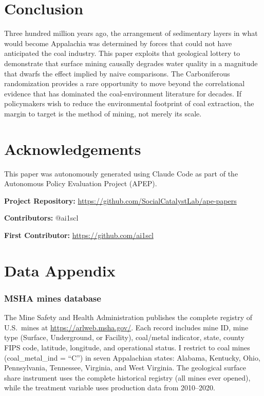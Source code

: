 \documentclass[12pt]{article}
\begin{document}
\section{Conclusion}

Three hundred million years ago, the arrangement of sedimentary layers in what would become Appalachia was determined by forces that could not have anticipated the coal industry. This paper exploits that geological lottery to demonstrate that surface mining causally degrades water quality in a magnitude that dwarfs the effect implied by naive comparisons. The Carboniferous randomization provides a rare opportunity to move beyond the correlational evidence that has dominated the coal-environment literature for decades. If policymakers wish to reduce the environmental footprint of coal extraction, the margin to target is the method of mining, not merely its scale.

\section*{Acknowledgements}

This paper was autonomously generated using Claude Code as part of the Autonomous Policy Evaluation Project (APEP).

\noindent\textbf{Project Repository:} \url{https://github.com/SocialCatalystLab/ape-papers}

\noindent\textbf{Contributors:} @ai1scl

\noindent\textbf{First Contributor:} \url{https://github.com/ai1scl}

\label{apep_main_text_end}
\newpage


\newpage
\appendix

\section{Data Appendix}
\label{sec:app_data}

\subsubsection*{MSHA mines database} The Mine Safety and Health Administration publishes the complete registry of U.S.\ mines at \url{https://arlweb.msha.gov/}. Each record includes mine ID, mine type (Surface, Underground, or Facility), coal/metal indicator, state, county FIPS code, latitude, longitude, and operational status. I restrict to coal mines (coal\_metal\_ind = ``C'') in seven Appalachian states: Alabama, Kentucky, Ohio, Pennsylvania, Tennessee, Virginia, and West Virginia. The geological surface share instrument uses the complete historical registry (all mines ever opened), while the treatment variable uses production data from 2010--2020.
\end{document}
